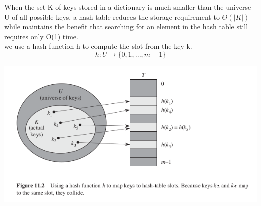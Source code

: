 \documentclass[11pt]{article}
\begin{document}
When the set K of keys stored in a dictionary is much smaller than the universe U of all possible keys, a hash table reduces the storage requirement to $\Theta(|K|)$ while maintains the benefit that searching for an element in the hash table still requires only O(1) time. \\


we use a hash function h to compute the slot from the key k. \\
\begin{equation}
h: U \rightarrow \{0,1,...,m-1\}
\end{equation}

\includegraphics[width=.9\linewidth]{pics/c11_hash_table.png} \\
\end{document}
